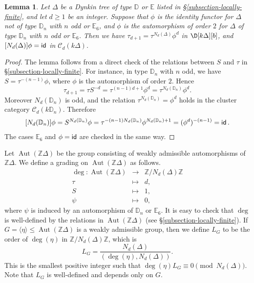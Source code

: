 \documentclass[12pt]{article}
\theoremstyle{plain}
\newtheorem{Lem}[Def]{Lemma}
\theoremstyle{definition}
\DeclareMathOperator{\Aut}{Aut}
\DeclareMathOperator{\id}{\sf id}
\newcommand{\Db}[1][]{\D[#1][b]}
\newcommand{\lra}{\longrightarrow}
\renewcommand{\leq}{\leqslant}
\renewcommand{\geq}{\geqslant}
\begin{document}
\begin{Lem}\label{lem-N}
Let $\Delta$ be a Dynkin tree of type $\mathbb{D}$ or $\mathbb{E}$ listed in \S \ref{subsection-locally-finite}, and let $d\geq 1$ be an integer. Suppose that  $\phi$ is the identity functor for $\Delta$ not of type $\mathbb{D}_n$ with $n$ odd or $\mathbb{E}_6$, and $\phi$ is the automorphism of order $2$ for $\Delta$ of type $\mathbb{D}_n$ with $n$ odd or $\mathbb{E}_6$. Then we have $\tau_{d+1}=\tau^{N_d(\Delta)}\phi^d$ in $\Db[k\Delta]$, and 
$[N_d(\Delta)]\phi=\id$  in $\mathcal{C}_d(k\Delta)$.
\end{Lem}
\begin{proof}
The lemma follows from a direct check of the relations between $S$ and $\tau$
in \S \ref{subsection-locally-finite}.  For instance, in type
\(\mathbb D_n\) with \(n\) odd, we have
\(S=\tau^{-(n-1)}\phi\), where \(\phi\) is the automorphism of order \(2\).
Hence
\[
\tau_{d+1}=\tau S^{-d}=\tau^{(n-1)d+1}\phi^d
=\tau^{N_d(\mathbb D_n)}\phi^d .
\]
Moreover \(N_d(\mathbb D_n)\) is odd, and the relation
\(\tau^{N_d(\mathbb D_n)}=\phi^d\) holds in the cluster category
\(\mathcal C_d(k\mathbb D_n)\).  Therefore
\[
[N_d(\mathbb D_n)]\phi
=S^{N_d(\mathbb D_n)}\phi
=\tau^{-(n-1)N_d(\mathbb D_n)}\phi^{N_d(\mathbb D_n)+1}
=(\phi^d)^{-(n-1)}=\id .
\]
The cases \(\mathbb E_6\) and \(\phi=\id\) are checked in the same way.
\end{proof}



Let $\Aut(\mathbb{Z}\Delta)$ be the group consisting of weakly admissible automorphisms of $\mathbb{Z}\Delta$. We define a grading on $\Aut(\mathbb{Z}\Delta)$ as follows.  
\[\begin{array}{rcl}
    \deg:\Aut(\mathbb{Z}\Delta) & \lra & \mathbb{Z}/N_d(\Delta)\mathbb{Z}\\
    \tau & \mapsto & d,\\
    S & \mapsto & 1,\\
   \psi & \mapsto & 0,
\end{array}
\]
where  $\psi$ is induced by an automorphism of $\mathbb{D}_n$ or $\mathbb{E}_6$. It is easy to check that $\deg$ is well-defined by the relations in $\Aut(\mathbb{Z}\Delta)$ (see \S \ref{subsection-locally-finite}). If $G=\langle\eta\rangle\leq \Aut(\mathbb{Z}\Delta)$ is a weakly admissible group, then we define $L_G$ to be the order of $\deg(\eta)$ in $\mathbb{Z}/N_d(\Delta)\mathbb{Z}$, which is 
\[L_G=\frac{N_d(\Delta)}{(\deg(\eta),N_d(\Delta))}.\]
This is the smallest positive integer such that $\deg(\eta) L_G \equiv 0 \pmod{N_d(\Delta)}$. Note that $L_G$ is well-defined and depends only on $G$.
\end{document}
